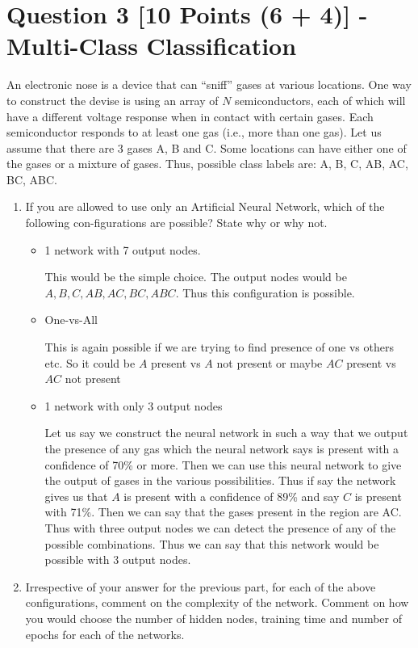 \documentclass[fontsize=10pt,DIV=14]{scrartcl}
\begin{document}
	\section{Question 3 [10 Points (6 + 4)] - Multi-Class Classification}


	An electronic nose is a device that can ``sniff'' gases at various locations. One way to construct the devise is using an array of $N$ semiconductors, each of which will have a different voltage response when in contact with certain gases. Each semiconductor responds to at least one gas (i.e., more than one gas). Let us assume that there are 3 gases A, B and C. Some locations can have either one of the gases or a mixture of gases. Thus, possible class labels are: A, B, C, AB, AC, BC, ABC.

	\begin{enumerate}
		\item
		If you are allowed to use only an Artiﬁcial Neural Network, which of the following con-ﬁgurations are possible? State why or why not.
		\begin{itemize}
			\item
			1 network with 7 output nodes.

			This would be the simple choice. The output nodes would be $A, B, C, AB, AC, BC, ABC$. Thus this configuration is possible. 
			\item
			One-vs-All

			This is again possible if we are trying to find presence of one vs others etc. So it could be $A$ present vs $A$ not present or maybe $AC$ present vs $AC$ not present

			\item
			1 network with only 3 output nodes

			Let us say we construct the neural network in such a way that we output the presence of any gas which the neural network says is present with a confidence of 70\% or more. Then we can use this neural network to give the output of gases in the various possibilities. Thus if say the network gives us that $A$ is present with a confidence of 89\% and say $C$ is present with 71\%. Then we can say that the gases present in the region are AC. Thus with three output nodes we can detect the presence of any of the possible combinations. Thus we can say that this network would be possible with 3 output nodes.
		\end{itemize}

		\item
		Irrespective of your answer for the previous part, for each of the above conﬁgurations, comment on the complexity of the network. Comment on how you would choose the number of hidden nodes, training time and number of epochs for each of the networks.


\end{enumerate}
\end{document}
